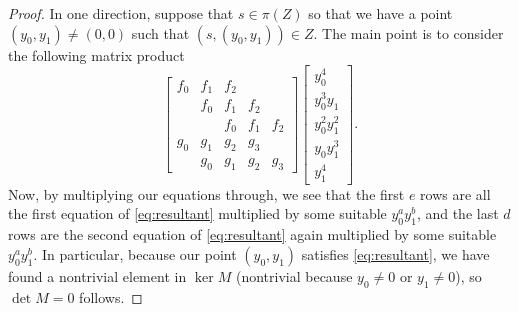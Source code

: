 \begin{proof}
	In one direction, suppose that $s\in\pi(Z)$ so that we have a point $(y_0,y_1)\ne(0,0)$ such that $(s,(y_0,y_1))\in Z$. The main point is to consider the following matrix product
	\[\begin{bmatrix}
		f_0 & f_1 & f_2 \\
		    & f_0 & f_1 & f_2 \\
			&     & f_0 & f_1 & f_2 \\
		g_0 & g_1 & g_2 & g_3 \\
		    & g_0 & g_1 & g_2 & g_3
	\end{bmatrix}\begin{bmatrix}
		y_0^4 \\
		y_0^3y_1 \\
		y_0^2y_1^2 \\
		y_0y_1^3 \\
		y_1^4
	\end{bmatrix}.\]
	Now, by multiplying our equations through, we see that the first $e$ rows are all the first equation of \autoref{eq:resultant} multiplied by some suitable $y_0^ay_1^b$, and the last $d$ rows are the second equation of \autoref{eq:resultant} again multiplied by some suitable $y_0^ay_1^b$. In particular, because our point $(y_0,y_1)$ satisfies \autoref{eq:resultant}, we have found a nontrivial element in $\ker M$ (nontrivial because $y_0\ne0$ or $y_1\ne0$), so $\det M=0$ follows.


\end{proof}
